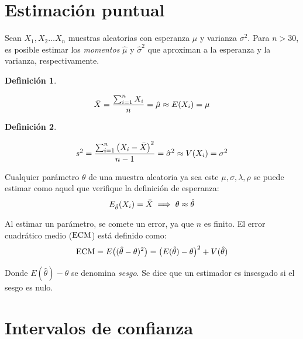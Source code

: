 \documentclass[a5paper,12pt,twoside]{book}
\newtheorem{defn}{{Definición}}[chapter]
\begin{document}
\section{Estimación puntual}

Sean $X_1,X_2 \dots X_n$ muestras aleatorias con esperanza $\mu$ y varianza $\sigma^2$.
Para $n>30$, es posible estimar los \emph{momentos} $\hat{\mu}$ y $\hat{\sigma}^2$ que aproximan a la esperanza y la varianza, respectivamente.

\begin{mdframed}[style=MyFrame1]
    \begin{defn}
    \end{defn}
    \begin{equation*}
        \bar{X} = \frac{\sum_{i=1}^n X_i}{n} = \hat{\mu} \approx E(X_i) = \mu
    \end{equation*}
\end{mdframed}

\begin{mdframed}[style=MyFrame1]
    \begin{defn}
    \end{defn}
    \begin{equation*}
        s^2 = \frac{\sum_{i=1}^n \left(X_i - \bar{X}\right)^2}{n-1} = \hat{\sigma}^2 \approx V(X_i) = \sigma^2 
    \end{equation*}
\end{mdframed}

Cualquier parámetro $\theta$ de una muestra aleatoria ya sea este $\mu, \sigma, \lambda, \rho$ se puede estimar como aquel que verifique la definición de esperanza:
\begin{equation*}
    E_{\hat{\theta}} (X_i) = \bar{X} \implies \theta \approx \hat{\theta}
\end{equation*}

Al estimar un parámetro, se comete un error, ya que $n$ es finito. El error cuadrático medio ($\operatorname{ECM}$) está definido como:
\begin{equation*}
    \operatorname{ECM} = E \big( (\hat{\theta} - \theta)^2 \big)
    = \big( E(\hat{\theta})-\theta \big)^2 + V(\hat{\theta})
\end{equation*}

Donde $E(\hat{\theta})-\theta$ se denomina \emph{sesgo}.
Se dice que un estimador es insesgado si el sesgo es nulo.


\section{Intervalos de confianza}
\end{document}
